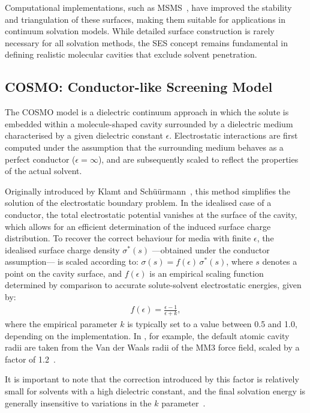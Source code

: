 Computational implementations, such as MSMS~\cite{Sanner1996}, have improved
the stability and triangulation of these surfaces, making them suitable for
applications in continuum solvation models. While detailed surface construction
is rarely necessary for all solvation methods, the SES concept remains
fundamental in defining realistic molecular cavities that exclude solvent
penetration.

\subsection{COSMO: Conductor-like Screening Model}

The COSMO model is a dielectric continuum approach in which the solute is embedded
within a molecule-shaped cavity surrounded by a dielectric medium characterised by
a given dielectric constant $\epsilon$. Electrostatic interactions are first computed
under the assumption that the surrounding medium behaves as a perfect conductor
($\epsilon = \infty$), and are subsequently scaled to reflect the properties of the
actual solvent.

Originally introduced by Klamt and Schüürmann~\cite{Klamt1993}, this method
simplifies the solution of the electrostatic boundary problem. In the idealised
case of a conductor, the total electrostatic potential vanishes at the surface
of the cavity, which allows for an efficient determination of the induced
surface charge distribution.  To recover the correct behaviour for media with
finite $\epsilon$, the idealised surface charge density $\sigma^*(s)$
---obtained under the conductor assumption--- is scaled according to:
$\sigma(s) = f(\epsilon) \, \sigma^*(s)$, where $s$ denotes a point on the
cavity surface, and $f(\epsilon)$ is an empirical scaling function determined
by comparison to accurate solute-solvent electrostatic energies,
given by:
%
\begin{align}
  f(\epsilon) = \frac{\epsilon - 1}{\epsilon + k},
\end{align}
%
\noindent where the empirical parameter $k$ is typically set to a value between
0.5 and 1.0, depending on the implementation. In \adf, for example,
the default atomic cavity radii are taken from the Van der Waals radii of
the MM3 force field, scaled by a factor of 1.2~\cite{Allinger1994, adfcosmo}.

It is important to note that the correction introduced by this factor is
relatively small for solvents with a high dielectric constant, and the final
solvation energy is generally insensitive to variations in the $k$ parameter~\cite{Tomasi2005}.

